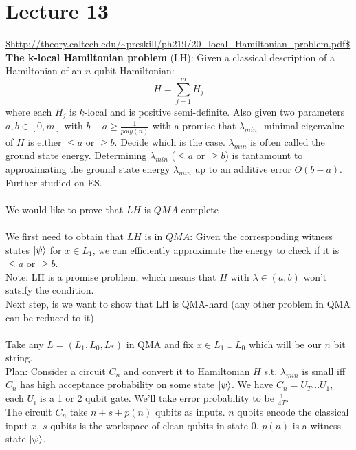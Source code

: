 \documentclass{article}
\begin{document}
                       \section{Lecture 13}
                       \url{$http://theory.caltech.edu/~preskill/ph219/20_local_Hamiltonian_problem.pdf$}\\
                       \textbf{The k-local Hamiltonian problem} (LH): Given a classical description of a Hamiltonian of an $n$ qubit Hamiltonian:
                       $$
                       H = \sum_{j=1}^m H_j
                       $$
                       where each $H_j$ is $k$-local and is positive semi-definite. Also given two parameters $a,b \in [0,m]$ with $b-a \geq \frac{1}{poly(n)}$ with a promise that $\lambda_{min}$- minimal eigenvalue of $H$ is either $\leq a$ or $\geq b$. Decide which is the case.
                       $\lambda_{min}$ is often called the ground state energy. Determining $\lambda_{min}$ ($\leq a$ or $\geq b$) is tantamount to approximating the ground state energy $\lambda_{min}$ up to an additive error $O(b-a)$. Further studied on ES.\\\\
                       We would like to prove that $LH$ is $QMA$-complete\\\\
                       We first need to obtain that $LH$ is in $QMA$: Given the corresponding witness states $\ket{\psi}$ for $x \in L_1$, we can efficiently approximate the energy to check if it is $\leq a$ or $\geq b$.\\
                       Note: LH is a promise problem, which means that $H$ with $\lambda \in (a,b)$ won't satsify the condition.\\
                       Next step, is we want to show that LH is QMA-hard (any other problem in QMA can be reduced to it)\\\\
                       Take any $L= (L_1, L_0, L_*)$ in QMA and fix $x \in L_1 \cup L_0$ which will be our $n$ bit string.\\
                       Plan: Consider a circuit $C_n$ and convert it to Hamiltonian $H$ s.t. $\lambda_{min}$ is small iff $C_n$ has high acceptance probability on some state $\ket{\psi}$. We have $C_n = U_T...U_1$, each $U_i$ is a 1 or 2 qubit gate. We'll take error probability to be $\frac{1}{4T}$. \\
                       The circuit $C_n$ take $n+s+ p(n)$ qubits as inputs. $n$ qubits encode the classical input $x$. $s$ qubits is the workspace of clean qubits in state $0$. $p(n)$ is a witness state $\ket{\psi}$.\\\\
\end{document}
